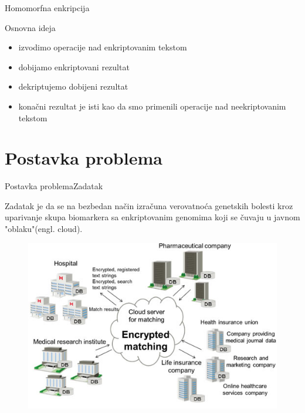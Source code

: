 \documentclass[10pt]{beamer}
\begin{document}
\begin{frame}{Homomorfna enkripcija}
\begin{block}{Osnovna ideja}
	\begin{itemize}
		\item izvodimo operacije nad enkriptovanim tekstom
		\item dobijamo enkriptovani rezultat
		\item dekriptujemo dobijeni rezultat
		\item konačni rezultat je isti kao da smo primenili operacije nad neekriptovanim tekstom
	\end{itemize}
\end{block}
\end{frame}

\section{Postavka problema}
\begin{frame}{Postavka problema}{Zadatak}
\begin{block}{}
	Zadatak je da se na bezbedan način izračuna verovatnoća genetskih
bolesti kroz uparivanje skupa biomarkera sa enkriptovanim genomima koji
se čuvaju u javnom "oblaku"(engl. cloud).
\end{block}
\end{frame}

\begin{frame}
\begin{figure}[H]
 	\centering
	\includegraphics[width=\textwidth,height=\textheight,keepaspectratio]{slika2.jpg}
 	\label{fig:primer}
 \end{figure}
\end{frame}
\end{document}
